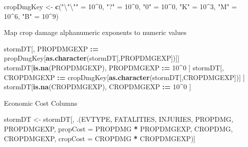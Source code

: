 \documentclass[]{article}
\newenvironment{Shaded}{\begin{snugshade}}{\end{snugshade}}
\newcommand{\CharTok}[1]{\textcolor[rgb]{0.31,0.60,0.02}{#1}}
\newcommand{\DataTypeTok}[1]{\textcolor[rgb]{0.13,0.29,0.53}{#1}}
\newcommand{\DecValTok}[1]{\textcolor[rgb]{0.00,0.00,0.81}{#1}}
\newcommand{\ErrorTok}[1]{\textcolor[rgb]{0.64,0.00,0.00}{\textbf{#1}}}
\newcommand{\KeywordTok}[1]{\textcolor[rgb]{0.13,0.29,0.53}{\textbf{#1}}}
\newcommand{\NormalTok}[1]{#1}
\newcommand{\OperatorTok}[1]{\textcolor[rgb]{0.81,0.36,0.00}{\textbf{#1}}}
\newcommand{\StringTok}[1]{\textcolor[rgb]{0.31,0.60,0.02}{#1}}
\begin{document}
\begin{Shaded}
\begin{Highlighting}[]
\NormalTok{cropDmgKey <-}\StringTok{  }\KeywordTok{c}\NormalTok{(}\StringTok{"}\CharTok{\textbackslash{}"\textbackslash{}"}\StringTok{"}\NormalTok{ =}\StringTok{ }\DecValTok{10}\OperatorTok{^}\DecValTok{0}\NormalTok{,}
                \StringTok{"?"}\NormalTok{ =}\StringTok{ }\DecValTok{10}\OperatorTok{^}\DecValTok{0}\NormalTok{, }
                \StringTok{"0"}\NormalTok{ =}\StringTok{ }\DecValTok{10}\OperatorTok{^}\DecValTok{0}\NormalTok{,}
                \StringTok{"K"}\NormalTok{ =}\StringTok{ }\DecValTok{10}\OperatorTok{^}\DecValTok{3}\NormalTok{,}
                \StringTok{"M"}\NormalTok{ =}\StringTok{ }\DecValTok{10}\OperatorTok{^}\DecValTok{6}\NormalTok{,}
                \StringTok{"B"}\NormalTok{ =}\StringTok{ }\DecValTok{10}\OperatorTok{^}\DecValTok{9}\NormalTok{)}
\end{Highlighting}
\end{Shaded}

Map crop damage alphanumeric exponents to numeric values

\begin{Shaded}
\begin{Highlighting}[]
\NormalTok{stormDT[, PROPDMGEXP }\OperatorTok{:}\ErrorTok{=}\StringTok{ }\NormalTok{propDmgKey[}\KeywordTok{as.character}\NormalTok{(stormDT[,PROPDMGEXP])]]}
\NormalTok{stormDT[}\KeywordTok{is.na}\NormalTok{(PROPDMGEXP), PROPDMGEXP }\OperatorTok{:}\ErrorTok{=}\StringTok{ }\DecValTok{10}\OperatorTok{^}\DecValTok{0}\NormalTok{ ]}
\NormalTok{stormDT[, CROPDMGEXP }\OperatorTok{:}\ErrorTok{=}\StringTok{ }\NormalTok{cropDmgKey[}\KeywordTok{as.character}\NormalTok{(stormDT[,CROPDMGEXP])] ]}
\NormalTok{stormDT[}\KeywordTok{is.na}\NormalTok{(CROPDMGEXP), CROPDMGEXP }\OperatorTok{:}\ErrorTok{=}\StringTok{ }\DecValTok{10}\OperatorTok{^}\DecValTok{0}\NormalTok{ ]}
\end{Highlighting}
\end{Shaded}

Economic Cost Columns

\begin{Shaded}
\begin{Highlighting}[]
\NormalTok{stormDT <-}\StringTok{ }\NormalTok{stormDT[, .(EVTYPE, FATALITIES, INJURIES, PROPDMG, PROPDMGEXP, }\DataTypeTok{propCost =}\NormalTok{ PROPDMG }\OperatorTok{*}\StringTok{ }\NormalTok{PROPDMGEXP, CROPDMG, CROPDMGEXP, }\DataTypeTok{cropCost =}\NormalTok{ CROPDMG }\OperatorTok{*}\StringTok{ }\NormalTok{CROPDMGEXP)]}
\end{Highlighting}
\end{Shaded}
\end{document}
